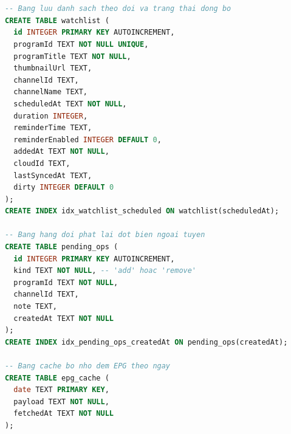 \appendix
\section{}
\label{app:sqlite}


\begin{lstlisting}[language=SQL, caption={\bi{Cấu trúc DDL của các bảng trong SQLite cục bộ.}{DDL definitions of local SQLite tables.}}]
-- Bang luu danh sach theo doi va trang thai dong bo
CREATE TABLE watchlist (
  id INTEGER PRIMARY KEY AUTOINCREMENT,
  programId TEXT NOT NULL UNIQUE,
  programTitle TEXT NOT NULL,
  thumbnailUrl TEXT,
  channelId TEXT,
  channelName TEXT,
  scheduledAt TEXT NOT NULL,
  duration INTEGER,
  reminderTime TEXT,
  reminderEnabled INTEGER DEFAULT 0,
  addedAt TEXT NOT NULL,
  cloudId TEXT,
  lastSyncedAt TEXT,
  dirty INTEGER DEFAULT 0
);
CREATE INDEX idx_watchlist_scheduled ON watchlist(scheduledAt);

-- Bang hang doi phat lai dot bien ngoai tuyen
CREATE TABLE pending_ops (
  id INTEGER PRIMARY KEY AUTOINCREMENT,
  kind TEXT NOT NULL, -- 'add' hoac 'remove'
  programId TEXT NOT NULL,
  channelId TEXT,
  note TEXT,
  createdAt TEXT NOT NULL
);
CREATE INDEX idx_pending_ops_createdAt ON pending_ops(createdAt);

-- Bang cache bo nho dem EPG theo ngay
CREATE TABLE epg_cache (
  date TEXT PRIMARY KEY,
  payload TEXT NOT NULL,
  fetchedAt TEXT NOT NULL
);
\end{lstlisting}

\section{}
\label{app:mapping}


